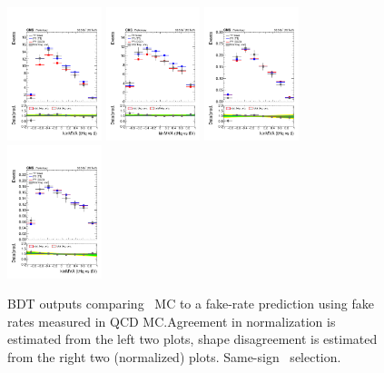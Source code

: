 \begin{figure}[htb]
 \centering
 \includegraphics[width=0.245\textwidth]{figures/FR_closures/thqMVA_tt_2lss_mm_norm.pdf} 
 \includegraphics[width=0.245\textwidth]{figures/FR_closures/thqMVA_ttv_2lss_mm_norm.pdf} 
 \includegraphics[width=0.245\textwidth]{figures/FR_closures/thqMVA_tt_2lss_mm_shape.pdf} 
 \includegraphics[width=0.245\textwidth]{figures/FR_closures/thqMVA_ttv_2lss_mm_shape.pdf} \\
\caption{BDT outputs comparing \ttbar\ MC to a fake-rate prediction using fake rates measured in QCD MC.\@ Agreement in normalization is estimated from the left two plots, shape disagreement is estimated from the right two (normalized) plots. Same-sign \mumu\ selection.} 
\label{fig:frclosure_2lss_mm}
\end{figure} 

